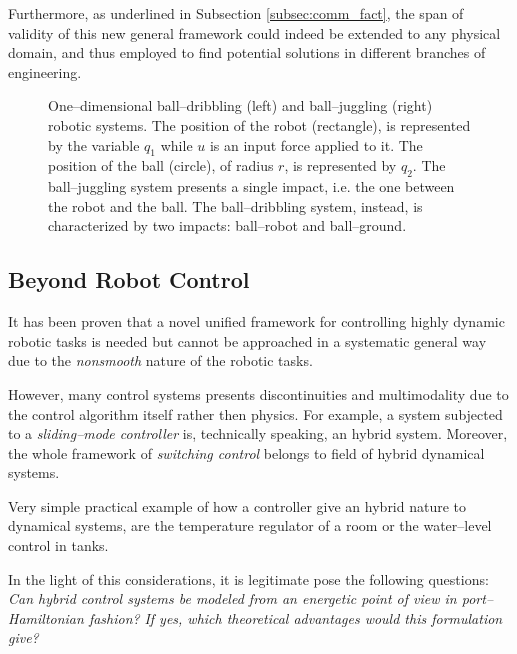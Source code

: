 Furthermore, as underlined in Subsection \ref{subsec:comm_fact}, the span of validity of this new general framework could indeed be extended to any physical domain, and thus employed to find potential solutions in different branches of engineering.
%
\begin{figure}[!t]
	\centering
	
	
	\caption[One--dimensional ball--dribbling and ball--juggling robotic systems.]{One--dimensional ball--dribbling (left) and ball--juggling (right) robotic systems. The position of the robot (rectangle), is represented by the variable $q_1$ while $u$ is an input force applied to it. The position of the ball (circle), of radius $r$, is represented by $q_2$. The ball--juggling system presents a single impact, i.e. the one between the robot and the ball. The ball--dribbling system, instead, is characterized by two impacts: ball--robot and ball--ground.}
	\label{fig:1D}
\end{figure}
%
\subsection{Beyond Robot Control}
It has been proven that a novel unified framework for controlling highly dynamic robotic tasks is needed but cannot be approached in a systematic general way due to the \textit{nonsmooth} nature of the robotic tasks.
%
\newline

%
However, many control systems presents discontinuities and multimodality due to the control algorithm itself rather then physics. 
For example, a system subjected to a \textit{sliding--mode controller} \citep{pisano2011sliding} is, technically speaking, an hybrid system. Moreover, the whole framework of \textit{switching control} belongs to field of hybrid dynamical systems.
%
\newline

%
Very simple practical example of how a controller give an hybrid nature to dynamical systems, are the temperature regulator of a room or the water--level control in tanks.
%
\newline
    
%
In the light of this considerations, it is legitimate pose the following questions: \newline
\textit{Can hybrid control systems be modeled from an energetic point of view in port--Hamiltonian fashion?}\newline
\textit{If yes, which theoretical advantages would this formulation give?}


